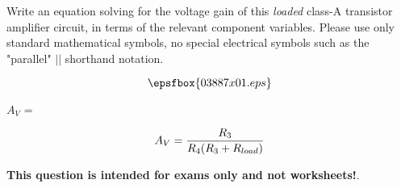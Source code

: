 

Write an equation solving for the voltage gain of this {\it loaded} class-A transistor amplifier circuit, in terms of the relevant component variables.  Please use only standard mathematical symbols, no special electrical symbols such as the "parallel" $||$ shorthand notation.

$$\epsfbox{03887x01.eps}$$

$A_V$ = 







$$A_V = {R_3 \over {R_4(R_3 + R_{load})}}$$







{\bf This question is intended for exams only and not worksheets!}.



